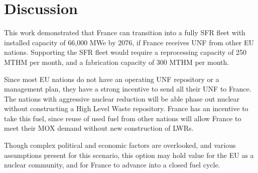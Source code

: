 \section{Discussion}
This work demonstrated that France can transition into
a fully \gls{SFR} fleet with installed capacity of 66,000 MWe by 2076,
if France receives \gls{UNF} from other \gls{EU} nations.
Supporting the \gls{SFR} fleet would require a reprocessing capacity of 250 MTHM per month,
and a fabrication capacity of 300 MTHM per month.

Since most \gls{EU} nations do not have an operating \gls{UNF}
repository or a management plan, they have a strong incentive
to send all their \gls{UNF} to France. The nations
with aggressive nuclear reduction will be able phase out nuclear
without constructing a High Level Waste repository. France has an
incentive to take this fuel, since reuse of used fuel from
other nations will allow France to meet their MOX demand
without new construction of \glspl{LWR}.

Though complex political and economic factors are overlooked,
 and various assumptions present for this scenario,
this option may hold value for the \gls{EU} as a nuclear community,
and for France to advance into a closed fuel cycle.
